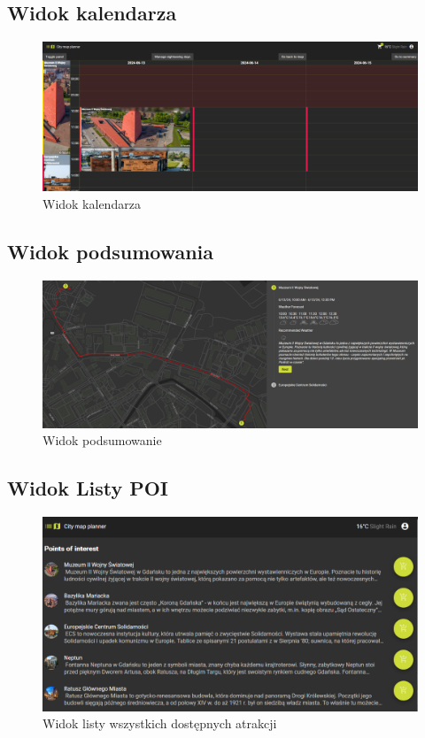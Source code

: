 \subsection{Widok kalendarza}
\label{sec:atrakcjawidok}
\begin{figure}[H]
        \centering
        \includegraphics[width=1\textwidth]{attachments/kalendarz}
        \caption{Widok kalendarza}
        \label{fig:kalendarz}
\end{figure}
\subsection{Widok podsumowania}
\label{sec:atrakcjawidok}
\begin{figure}[H]
    \centering
    \includegraphics[width=1\textwidth]{attachments/podsumowanie}
    \caption{Widok podsumowanie}
    \label{fig:podsumowanie}
\end{figure}
\subsection{Widok Listy POI}
\label{sec:poilist}

\begin{figure}[H]
    \centering
    \includegraphics[width=1\textwidth]{attachments/poilist}
    \caption{Widok listy wszystkich dostępnych atrakcji}
    \label{fig:poilist}
\end{figure}


